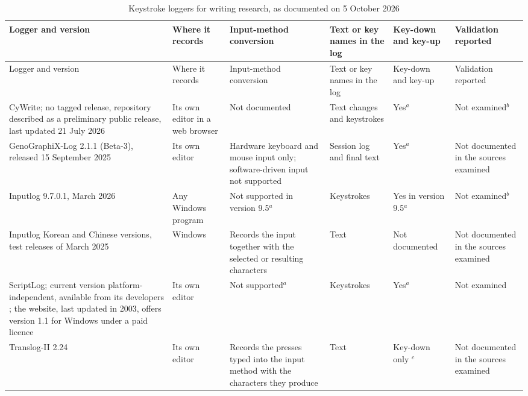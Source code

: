 \begin{landscape}
{\tablebodyfont
\begin{longtable}{L{0.17}L{0.14}L{0.19}L{0.14}L{0.13}L{0.21}}
\caption{Keystroke loggers for writing research, as documented on 5 October 2026}
\label{tab:loggers}\\
\toprule
Logger and version & Where it records & Input-method conversion & Text or key names in the log & Key-down and key-up & Validation reported \\
\midrule
\endfirsthead
{}
\toprule
Logger and version & Where it records & Input-method conversion & Text or key names in the log & Key-down and key-up & Validation reported \\
\midrule
\endhead
CyWrite; no tagged release, repository described as a preliminary public release, last updated 21 July 2026 \citep{cywrite-repo} & Its own editor in a web browser \citep{wengelin2023,cywrite-repo} & Not documented & Text changes and keystrokes \citep{wengelin2023} & Yes$^{a}$ & Not examined$^{b}$ \\
GenoGraphiX-Log 2.1.1 (Beta-3), released 15 September 2025 \citep{ggxlog-web} & Its own editor \citep{wengelin2023} & Hardware keyboard and mouse input only; software-driven input not supported \citep{ggxlog-web} & Session log and final text \citep{ggxlog-web} & Yes$^{a}$ & Not documented in the sources examined \\
Inputlog 9.7.0.1, March 2026 \citep{inputlog-web} & Any Windows program \citep{inputlog-web} & Not supported in version 9.5$^{a}$ & Keystrokes \citep{wengelin2023} & Yes in version 9.5$^{a}$ & Not examined$^{b}$ \\
Inputlog Korean and Chinese versions, test releases of March 2025 \citep{inputlog-web} & Windows & Records the input together with the selected or resulting characters \citep{inputlog-web} & Text & Not documented & Not documented in the sources examined \\
ScriptLog; current version platform-independent, available from its developers \citep{wengelin2023}; the website, last updated in 2003, offers version 1.1 for Windows under a paid licence \citep{scriptlog-web} & Its own editor \citep{wengelin2023} & Not supported$^{a}$ & Keystrokes \citep{wengelin2023} & Yes$^{a}$ & Not examined \\
Translog-II 2.24 \citep{translog-web} & Its own editor \citep{wengelin2023} & Records the presses typed into the input method with the characters they produce \citep{zou2026} & Text \citep{zou2026} & Key-down only \citep{zou2026}$^{c}$ & Not documented in the sources examined \\

\end{longtable}}
\end{landscape}
